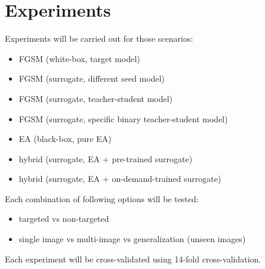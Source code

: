 \chapter{Experiments}
Experiments will be carried out for those scenarios:
\begin{itemize}
\item FGSM (white-box, target model)
\item FGSM (surrogate, different seed model)
\item FGSM (surrogate, teacher-student model)
\item FGSM (surrogate, specific binary teacher-student model)
\item EA (black-box, pure EA)
\item hybrid (surrogate, EA + pre-trained surrogate)
\item hybrid (surrogate, EA + on-demand-trained surrogate)
\end{itemize}

Each combination of following options will be tested:
\begin{itemize}
\item targeted vs non-targeted
\item single image vs multi-image vs generalization (unseen images)
\end{itemize}

Each experiment will be cross-validated using 14-fold cross-validation.
